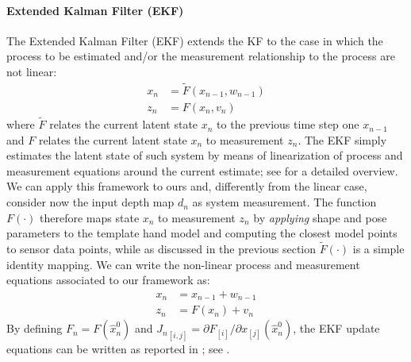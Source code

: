 \paragraph{Extended Kalman Filter (EKF)}
The Extended Kalman Filter (EKF) extends the KF to the case in which the process to be estimated and/or the measurement relationship to the process are not linear:
% 
\begin{align}
x_n &= \tilde{F}(x_{n - 1},  w_{n - 1}) \\
z_n &= F(x_n, v_n)
\end{align}
% 
where $\tilde{F}$ relates the current latent state $ x _n$ to the previous time step one $ x _{n-1}$ and $F$ relates the current latent state $ x _n$ to measurement $ z _n$.
The EKF simply estimates the latent state of such system by means of linearization of process and measurement equations around the current estimate; see \cite{welch1995introduction} for a detailed overview.
We can apply this framework to ours and, differently from the linear case, consider now the input depth map $d_n$ as system measurement. The function $F(\cdot)$ therefore maps state $x_n$ to measurement $z_n$ by \emph{applying} shape and pose parameters to the template hand model and computing the closest model points to sensor data points, while as discussed in the previous section $\tilde{F}(\cdot)$ is a simple identity mapping.
We can write the non-linear process and measurement equations associated to our framework as:
% 
\begin{align}
	x_n &= x_{n - 1} + w_{n - 1} \\
	z_n &= F(x_n) + v_n 
\end{align}
%
By defining $F_n = F(\hat{x}_n^0)$ and ${J_n}_{[i, j]} = \partial F_{[i]} / \partial x_{[j]}(\hat{x}_n^0)$, the EKF update equations can be written as reported in ; see \cite{welch1995introduction}.
%





